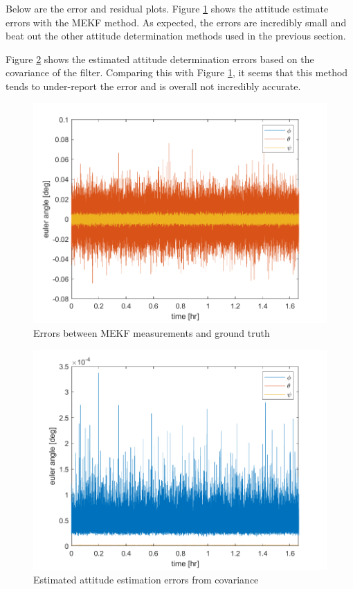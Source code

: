 Below are the error and residual plots. Figure \ref{fig:ps8_problem7_error} shows the attitude estimate errors with the MEKF method. As expected, the errors are incredibly small and beat out the other attitude determination methods used in the previous section.

Figure \ref{fig:ps8_problem7_cov} shows the estimated attitude determination errors based on the covariance of the filter. Comparing this with Figure \ref{fig:ps8_problem7_error}, it seems that this method tends to under-report the error and is overall not incredibly accurate.

\begin{figure}[H]
\centering
\includegraphics[scale=0.7]{Images/ps8_problem7_error.png}
\caption{Errors between MEKF measurements and ground truth}
\label{fig:ps8_problem7_error}
\end{figure}

\begin{figure}[H]
\centering
\includegraphics[scale=0.7]{Images/ps8_problem7_cov.png}
\caption{Estimated attitude estimation errors from covariance}
\label{fig:ps8_problem7_cov}
\end{figure}

